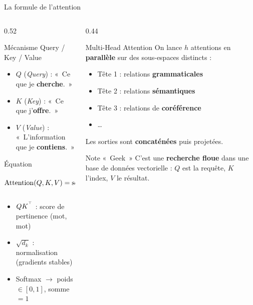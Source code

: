 \documentclass[aspectratio=169, 10pt]{beamer}
\begin{document}
\begin{frame}{La formule de l'attention}
  \begin{columns}[T]
    \begin{column}{0.52\textwidth}
      \begin{block}{Mécanisme Query / Key / Value}
        \begin{itemize}
          \item $Q$ (\textit{Query}) : «~Ce que je \textbf{cherche}.~»
          \item $K$ (\textit{Key}) : «~Ce que j'\textbf{offre}.~»
          \item $V$ (\textit{Value}) : «~L'information que je \textbf{contiens}.~»
        \end{itemize}
      \end{block}
      \smallskip
      \begin{block}{Équation}
        \[
          \mathrm{Attention}(Q,K,V)
          = \mathrm{softmax}\!\left(\frac{QK^{^{\top}}}{\sqrt{d_k}}\right)V
        \]
        \begin{itemize}
          \item $QK^{^{\top}}$ : score de pertinence (mot, mot)
          \item $\sqrt{d_k}$ : normalisation (gradients stables)
          \item Softmax $\to$ poids $\in [0,1]$, somme $= 1$
        \end{itemize}
      \end{block}
    \end{column}
    \begin{column}{0.44\textwidth}
      \begin{exampleblock}{Multi-Head Attention}
        On lance $h$ attentions en \textbf{parallèle}
        sur des sous-espaces distincts :
        \begin{itemize}
          \item Tête 1 : relations \textbf{grammaticales}
          \item Tête 2 : relations \textbf{sémantiques}
          \item Tête 3 : relations de \textbf{coréférence}
          \item \ldots
        \end{itemize}
        \vspace{4pt}
        Les sorties sont \textbf{concaténées} puis projetées.
      \end{exampleblock}
      \vspace{2pt}
      \begin{alertblock}{Note «~Geek~»}
        C'est une \textbf{recherche floue} dans une base de données
        vectorielle : $Q$ est la requête, $K$ l'index, $V$ le résultat.
      \end{alertblock}
    \end{column}
  \end{columns}
\end{frame}
\end{document}
